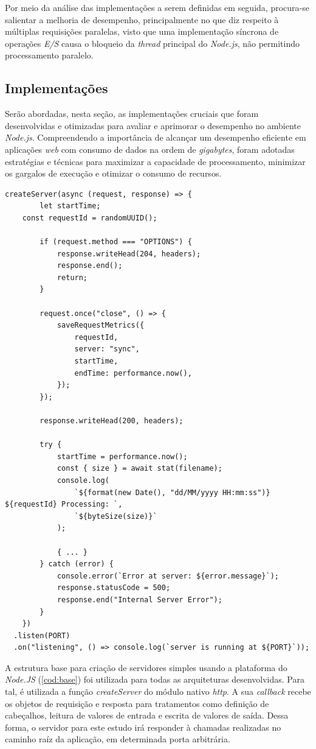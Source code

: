 \documentclass[12pt]{article}
\begin{document}
Por meio da análise das implementações a serem definidas em seguida, procura-se salientar a melhoria de desempenho,
principalmente no que diz respeito à múltiplas requisições paralelas, visto que uma implementação síncrona de operações
\textit{E/S} causa o bloqueio da \textit{thread} principal do \textit{Node.js}, não permitindo processamento paralelo.


\subsection{Implementações}

Serão abordadas, nesta seção, as implementações cruciais que foram desenvolvidas e 
otimizadas para avaliar e aprimorar o desempenho no ambiente \textit{Node.js}. Compreendendo a 
importância de alcançar um desempenho eficiente em aplicações \textit{web} com consumo de dados na ordem
de \textit{gigabytes}, foram adotadas estratégias e técnicas para maximizar a capacidade de 
processamento, minimizar os gargalos de execução e otimizar o consumo de recursos. 

\begin{lstlisting}[caption={Quadro base para um servidor \textit{Node.JS}}, label=cod:base]
	createServer(async (request, response) => {
		let startTime;
  	const requestId = randomUUID();

		if (request.method === "OPTIONS") {
			response.writeHead(204, headers);
			response.end();
			return;
		}

		request.once("close", () => {
			saveRequestMetrics({
				requestId,
				server: "sync",
				startTime,
				endTime: performance.now(),
			});
		});

		response.writeHead(200, headers);

		try {
			startTime = performance.now();
			const { size } = await stat(filename);
			console.log(
				`${format(new Date(), "dd/MM/yyyy HH:mm:ss")} ${requestId} Processing: `,
				`${byteSize(size)}`
			);

			{ ... }
		} catch (error) {
			console.error(`Error at server: ${error.message}`);
			response.statusCode = 500;
			response.end("Internal Server Error");
		}
	})
  .listen(PORT)
  .on("listening", () => console.log(`server is running at ${PORT}`));
\end{lstlisting}

A estrutura base para criação de servidores simples usando a 
plataforma do \textit{Node.JS} (\autoref{cod:base}) foi utilizada para todas as arquiteturas desenvolvidas. 
Para tal, é utilizada a função \textit{createServer} do módulo nativo \textit{http}.
A sua \textit{callback} recebe os objetos de requisição e resposta para tratamentos como definição de cabeçalhos, leitura
de valores de entrada e escrita de valores de saída. Dessa forma, o servidor para este estudo irá responder à chamadas
realizadas no caminho raíz da aplicação, em determinada porta arbitrária.
\end{document}
